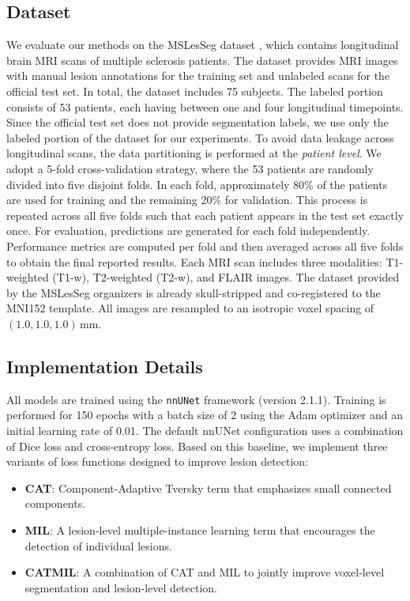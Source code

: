 \subsection{Dataset}

We evaluate our methods on the MSLesSeg dataset \cite{guarnera_mslesseg_2025},
which contains longitudinal brain MRI scans of multiple sclerosis patients.
The dataset provides MRI images with manual lesion annotations for the
training set and unlabeled scans for the official test set. In total, the dataset includes 75 subjects. The labeled portion consists of 53 patients, each having between one and four longitudinal timepoints. Since the official test set does not provide segmentation labels, we use only the
labeled portion of the dataset for our experiments. To avoid data leakage
across longitudinal scans, the data partitioning is performed at the
\textit{patient level}. We adopt a 5-fold cross-validation strategy, where the 53 patients are
randomly divided into five disjoint folds. In each fold, approximately
80\% of the patients are used for training and the remaining 20\% for
validation. This process is repeated across all five folds such
that each patient appears in the test set exactly once. For evaluation, predictions are generated for each fold independently. Performance metrics are computed per fold and then averaged across all
five folds to obtain the final reported results. Each MRI scan includes three modalities: T1-weighted (T1-w), T2-weighted (T2-w), and FLAIR images. The dataset provided by the MSLesSeg organizers
is already skull-stripped and co-registered to the MNI152 template. All images are resampled to an isotropic voxel spacing of $(1.0, 1.0, 1.0)\,\mathrm{mm}$.

\subsection{Implementation Details}

All models are trained using the \texttt{nnUNet} framework (version 2.1.1).
Training is performed for 150 epochs with a batch size of 2 using the Adam
optimizer and an initial learning rate of 0.01. The default nnUNet configuration uses a combination of Dice loss and cross-entropy loss. Based on this baseline, we implement three variants of
loss functions designed to improve lesion detection:

\begin{itemize}
    \item \textbf{CAT}: Component-Adaptive Tversky term that emphasizes
    small connected components.
    \item \textbf{MIL}: A lesion-level multiple-instance learning term that
    encourages the detection of individual lesions.
    \item \textbf{CATMIL}: A combination of CAT and MIL to jointly improve
    voxel-level segmentation and lesion-level detection.
\end{itemize}

